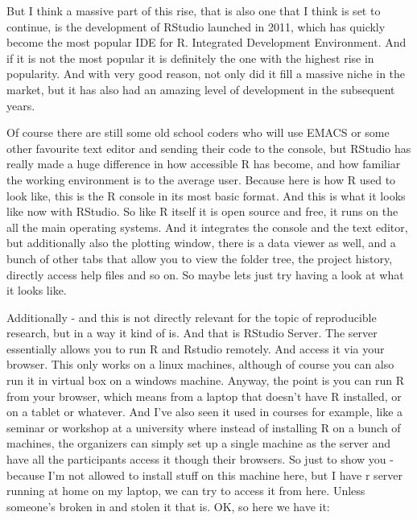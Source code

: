 \documentclass[12pt]{article}
\begin{document}
But I think a massive part of this rise, that is also one that I think is set to continue, is the development of RStudio launched in 2011, which has quickly become the most popular IDE for R. Integrated Development Environment. And if it is not the most popular it is definitely the one with the highest rise in popularity. And with very good reason, not only did it fill a massive niche in the market, but it has also had an amazing level of development in the subsequent years. 

Of course there are still some old school coders who will use EMACS or some other favourite text editor and sending their code to the console, but RStudio has really made a huge difference in how accessible R has become, and how familiar the working environment is to the average user. Because here is how R used to look like, this is the R console in its most basic format. And this is what it looks like now with RStudio. 
So like R itself it is open source and free, it runs on the all the main operating systems. And it integrates the console and the text editor, but additionally also the plotting window, there is a data viewer as well, and a bunch of other tabs that allow you to view the folder tree, the project history, directly access help files and so on. So maybe lets just try having a look at what it looks like. 

Additionally - and this is not directly relevant for the topic of reproducible research, but in a way it kind of is. And that is RStudio Server. The server essentially allows you to run R and Rstudio remotely. And access it via your browser. This only works on a linux machines, although of course you can also run it in virtual box on a windows machine. Anyway, the point is you can run R from your browser, which means from a laptop that doesn't have R installed, or on a tablet or whatever. And I've also seen it used in courses for example, like a seminar or workshop at a university where instead of installing R on a bunch of machines, the organizers can simply set up a single machine as the server and have all the participants access it though their browsers. So just to show you - because I'm not allowed to install stuff on this machine here, but I have r server running at home on my laptop, we can try to access it from here. Unless someone's broken in and stolen it that is. OK, so here we have it: 
\end{document}
